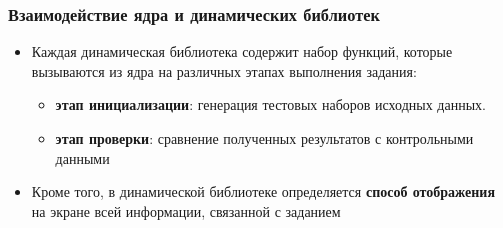 \begin{frame}
\frametitle{Взаимодействие ядра и динамических библиотек}
\begin{itemize}
    \item Каждая динамическая библиотека содержит набор функций, которые вызываются из ядра на различных этапах выполнения задания:
    \begin{itemize}
        \item \textbf{этап инициализации}: генерация тестовых наборов исходных данных.
        \item \textbf{этап проверки}: сравнение полученных результатов с контрольными данными
    \end{itemize}
    \item Кроме того, в динамической библиотеке определяется \textbf{способ отображения} на экране всей информации, связанной с заданием
\end{itemize}

\end{frame}
